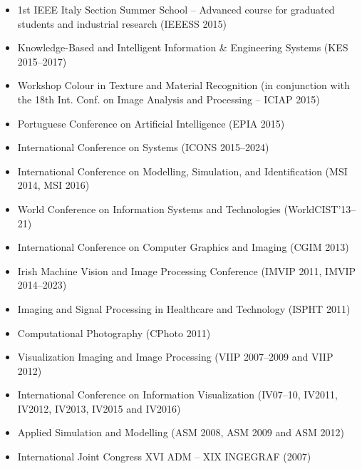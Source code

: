 \documentclass[11pt]{article}
\begin{document}
\begin{itemize}
  \item 1st IEEE Italy Section Summer School – Advanced course for graduated students and industrial research (IEEESS 2015)
  \item Knowledge-Based and Intelligent Information \& Engineering Systems (KES 2015--2017)
  \item Workshop Colour in Texture and Material Recognition (in conjunction with the 18th Int. Conf. on Image Analysis and Processing – ICIAP 2015)
  \item Portuguese Conference on Artificial Intelligence (EPIA 2015)
  \item International Conference on Systems (ICONS 2015--2024)
  \item International Conference on Modelling, Simulation, and Identification (MSI 2014, MSI 2016)
  \item World Conference on Information Systems and Technologies (WorldCIST'13--21)
  \item International Conference on Computer Graphics and Imaging (CGIM 2013)
  \item Irish Machine Vision and Image Processing Conference (IMVIP 2011, IMVIP 2014--2023)
  \item Imaging and Signal Processing in Healthcare and Technology (ISPHT 2011)
  \item Computational Photography (CPhoto 2011)
  \item Visualization Imaging and Image Processing (VIIP 2007--2009 and VIIP 2012) 
  \item International Conference on Information Visualization (IV07--10, IV2011, IV2012, IV2013, IV2015 and IV2016)
  \item Applied Simulation and Modelling (ASM 2008, ASM 2009 and ASM 2012)
  \item International Joint Congress XVI ADM -- XIX INGEGRAF (2007)
\end{itemize}
\end{document}
